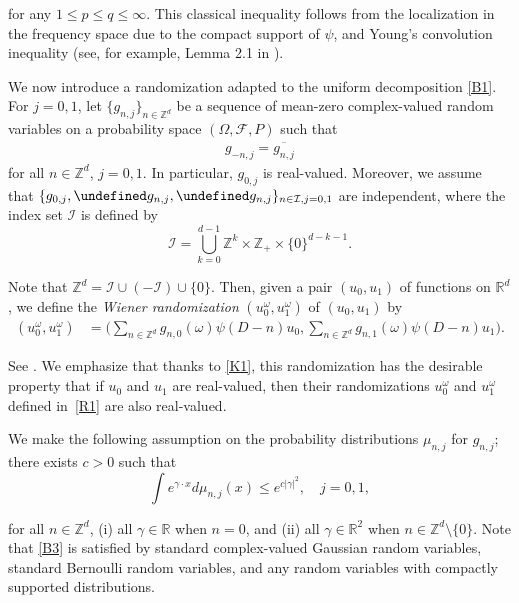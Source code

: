 \documentclass[letterpaper, 11pt,  reqno]{amsart}
\newcommand{\1}{\hspace{0.5mm}\text{I}\hspace{0.2mm}}
\newcommand{\noi}{\noindent}
\newcommand{\Z}{\mathbb{Z}}
\newcommand{\R}{\mathbb{R}}
\let\Re=\undefined\DeclareMathOperator*{\Re}{Re}
\let\Im=\undefined\DeclareMathOperator*{\Im}{Im}
\newcommand{\g}{\gamma}
\numberwithin{equation}{section}
\numberwithin{theorem}{section}
\begin{document}
\noi
for any $ 1\leq p \leq q \leq \infty$. This classical inequality follows from the localization in the frequency space due to the compact support of $\psi$, and Young's convolution inequality (see, for example, Lemma 2.1 in \cite{LM}).

We now introduce  a randomization 
adapted to the uniform decomposition \eqref{B1}.
For $j = 0, 1$, 
let $\{g_{n,j}\}_{n \in \Z^d}$ be a sequence of mean-zero complex-valued random variables
on a probability space $(\Omega, \mathcal{F}, P)$
such that 
\begin{align}
g_{-n,j}=\overline{g_{n,j}}
\label{K1}
\end{align}
for all $n\in\Z^d$, $j=0,1$.
In particular,  $g_{0, j}$ is real-valued.
Moreover, we  assume that 
$\{g_{0,j}, \Re g_{n,j}, \Im g_{n,j}\}_{n\in\mathcal I, j=0,1}$ are independent,
where the index set $\mathcal{I}$ is defined by 
\begin{equation*}
\mathcal I=\bigcup_{k=0}^{d-1} \Z^k\times \Z_{+}\times \{0\}^{d-k-1}.
\end{equation*}

\noi
Note that $\Z^d = \mathcal I \cup (-\mathcal I)\cup \{0\}$.
Then, given a pair $(u_0, u_1)$ of  functions on $\R^d$, 
we  define the \emph{Wiener randomization} $(u_0^\omega, u_1^\omega)$
of $(u_0,u_1)$ by
\begin{align}
(u_0^\omega, u_1^\omega) 
& = 
\bigg(\sum_{n \in \Z^d} g_{n,0} (\omega) \psi(D-n) u_0,
\sum_{n \in \Z^d} g_{n,1} (\omega) \psi(D-n) u_1\bigg).
\label{R1}
\end{align}


\noi
See \cite{ZF, LM, BOP1, BOP2}.
We emphasize that thanks to \eqref{K1},  this randomization has the desirable property that if $u_0$ and $u_1$ are real-valued,
then their randomizations $u_0^\omega$ and $u_1^\omega$ defined in~\eqref{R1}
are also real-valued.









We make the following assumption on the 
 probability distributions
$\mu_{n,j}$ for $g_{n, j}$;
 there exists $c>0$ such that
\begin{equation}
\int e^{\gamma \cdot x}d\mu_{n,j}(x)\leq e^{c|\gamma|^2}, \quad j = 0, 1, 
\label{B3}
\end{equation}
	
\noindent
for all $n \in \Z^d$,  
(i) all $\gamma \in \R$ when $n = 0$,
and (ii)  all $\g \in \R^2$ when $n \in \Z^d \setminus \{0\}$.
Note that \eqref{B3} is satisfied by
standard complex-valued Gaussian random variables,
standard Bernoulli random variables,
and any random variables with compactly supported distributions.
\end{document}

